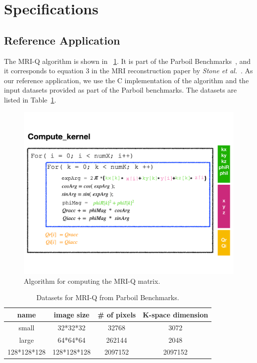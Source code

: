 \section{Specifications}

\subsection{Reference Application}

The MRI-Q algorithm is shown in \figurename~\ref{fig:algo}. It is part of the
Parboil Benchmarks~\cite{stratton2012parboil}, and it corresponds to equation 3
in the MRI reconstruction paper by \emph{Stone et
  al.}~\cite{stone2008accelerating}.
%
As our reference application, we use the C implementation of the algorithm and
the input datasets provided as part of the Parboil benchmarks. The datasets are
listed in Table~\ref{tab:datasets}.


\begin{figure}[t]
\centering
\includegraphics[width=\columnwidth]{figures/algorithm}
\caption{Algorithm for computing the MRI-Q matrix.}
\label{fig:algo}
\end{figure}


\begin{table}[t]
\centering
\begin{tabular}{c|c|c|c}
\toprule
\textbf{name} & \textbf{image size} & \textbf{\# of pixels} & \textbf{K-space dimension} \\
\midrule
small       & 32*32*32    & 32768   & 3072    \\
large       & 64*64*64    & 262144  & 2048    \\
128*128*128 & 128*128*128 & 2097152 & 2097152 \\
\bottomrule
\end{tabular}
\caption{Datasets for MRI-Q from Parboil Benchmarks.}
\label{tab:datasets}
\end{table}


